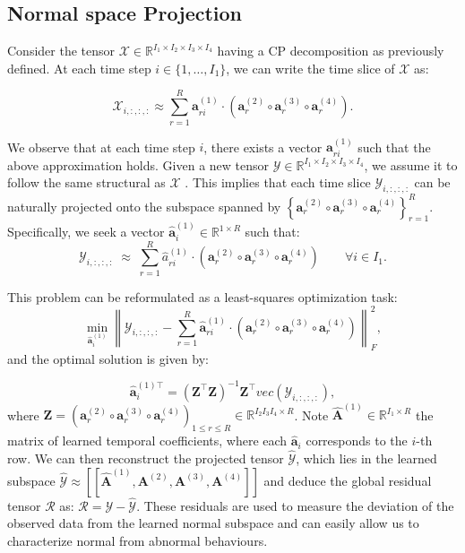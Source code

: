 \documentclass[pdflatex,sn-mathphys-num]{sn-jnl}
\theoremstyle{thmstyleone}
\theoremstyle{thmstyletwo}
\theoremstyle{thmstylethree}
\begin{document}
\subsection{Normal space Projection}
Consider the tensor \(\mathcal{X} \in \mathbb{R}^{I_1 \times I_2 \times I_3 \times I_4}\) having a CP decomposition as previously defined. At each time step \(i \in \{1, \dots, I_1\}\), we can write the time slice of \(\mathcal{X}\) as:

\begin{equation}
\mathcal{X}_{i,:,:,:} \approx \sum_{r=1}^{R} \mathbf{a}_{ri}^{(1)} \cdot \left( \mathbf{a}_r^{(2)} \circ \mathbf{a}_r^{(3)} \circ \mathbf{a}_r^{(4)} \right).
\end{equation}

\noindent We observe that at each time step \(i\), there exists a vector \(\mathbf{a}_{ri}^{(1)}\) such that the above approximation holds. Given a new tensor \(\mathcal{Y} \in \mathbb{R}^{I_1 \times I_2 \times I_3 \times I_4}\), we assume it to follow the same structural as \(\mathcal{X}\)  . This implies that each time slice \(\mathcal{Y}_{i,:,:,:}\) can be naturally projected onto the subspace spanned by \(\left\{\mathbf{a}_r^{(2)} \circ \mathbf{a}_r^{(3)} \circ \mathbf{a}_r^{(4)}  \right\}_{r=1}^{R}
\). Specifically, we seek a vector \(\hat{\mathbf{a}}_{i}^{(1)} \in \mathbb{R}^{1 \times R}\) such that:
\begin{equation}
\mathcal{Y}_{i,:,:,:} \;\approx\; 
\sum_{r=1}^{R} \hat{a}^{(1)}_{ri} \cdot 
\left( \mathbf{a}_r^{(2)} \circ \mathbf{a}_r^{(3)} \circ \mathbf{a}_r^{(4)} \right)
\qquad \forall i \in I_1.
\end{equation}



\noindent This problem can be reformulated as a least-squares optimization task:
\begin{equation}
\min_{\hat{\mathbf{a}}_{i}^{(1)}} \left\| \mathcal{Y}_{i,:,:,:} - \sum_{r=1}^{R} \hat{\mathbf{a}}_{ri}^{(1)} \cdot \left( \mathbf{a}_r^{(2)} \circ \mathbf{a}_r^{(3)} \circ \mathbf{a}_r^{(4)} \right)\right\|_F^2,
\end{equation} and the optimal solution is given by: 

\begin{equation}
\hat{\mathbf{a}}_{i}^{{(1)}\top} = \left(\mathbf{Z}^\top \mathbf{Z} \right)^{-1} \mathbf{Z}^\top vec(\mathcal{Y}_{i,:,:,:}),
\end{equation}
where \(\mathbf{Z}=\left( \mathbf{a}_r^{(2)} \circ \mathbf{a}_r^{(3)} \circ \mathbf{a}_r^{(4)} \right)_{1\leq r\leq R} \in \mathbb{R}^{I_2I_3I_4 \times R}\).
Note \(\mathbf{\hat{A}}^{(1)} \in \mathbb{R}^{I_1 \times R}\)  the matrix of learned temporal coefficients, where each  \(\hat{\mathbf{a}}_i\) corresponds to the $i$-th row. We can then reconstruct the projected tensor \(\mathcal{\hat{Y}}\), which lies in the learned subspace \(
\mathcal{\hat{Y}} \approx [\![\mathbf{\hat{A}}^{(1)}, \mathbf{A}^{(2)}, \mathbf{A}^{(3)}, \mathbf{A}^{(4)}]\!]
\) and deduce the global residual tensor $\mathcal{R}$ as:
\(\mathcal{R} = \mathcal{Y} - \mathcal{\hat{Y}}.\)
These residuals are used to measure the deviation of the observed data from the learned normal subspace and can easily allow us to characterize normal from abnormal behaviours.
\end{document}
